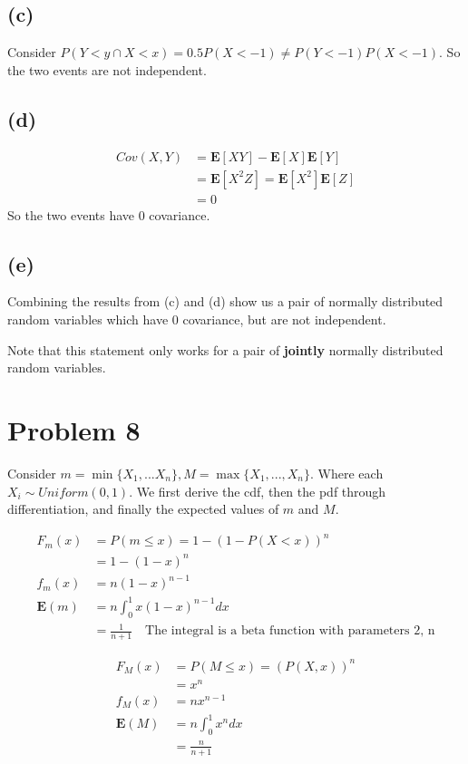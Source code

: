 \documentclass{article}
\begin{document}
	\subsection*{(c)}
	Consider $P(Y < y \cap X < x) = 0.5 P(X < -1) \neq P(Y < -1) P(X < -1)$. So the two events are not independent.
	
	\subsection*{(d)}
	\begin{align*}
	Cov(X,Y) &= \mathbf{E}[XY] - \mathbf{E}[X] \mathbf{E}[Y] \\
	&= \mathbf{E}[X^2 Z]  = \mathbf{E}[X^2] \mathbf{E}[Z] \\
	&= 0
	\end{align*} 
	So the two events have 0 covariance.
	
	\subsection*{(e)}
	Combining the results from (c) and (d) show us a pair of normally distributed random variables which have 0 covariance, but are not independent.
	
	Note that this statement only works for a pair of \textbf{jointly} normally distributed random variables.
	
	\section*{Problem 8}
	Consider $m = \min \{ X_1, ... X_n \}, M = \max \{ X_1,...,X_n\}$. Where each $X_i \sim Uniform(0,1)$. We first derive the cdf, then the pdf through differentiation, and finally the expected values of $m$ and $M$.
	
	\begin{align*}
	F_m(x) &= P(m \leq x) = 1 - (1- P(X < x))^n \\
	&= 1 - (1- x)^n\\
	f_m(x) &= n(1 - x)^{n-1}	\\
	\mathbf{E}(m) &= n \int_{0}^{1} x(1-x)^{n-1} dx \\
	&= \frac{1}{n+1} \quad \text{The integral is a beta function with parameters 2, n}
	\end{align*}
	
	\begin{align*}
	F_M(x) &= P(M \leq x) = (P(X, x))^n \\
	&= x^n \\
	f_M(x) &= nx^{n-1} \\
	\mathbf{E}(M) &= n \int_{0}^{1} x^{n} dx \\
	&= \frac{n}{n+1}
	\end{align*}
	
\end{document}
